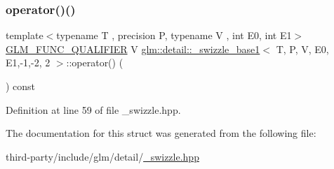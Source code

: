 \subsubsection{\texorpdfstring{operator()()}{operator()()}}
{\footnotesize\ttfamily template$<$typename T , precision P, typename V , int E0, int E1$>$ \\
\hyperlink{setup_8hpp_a33fdea6f91c5f834105f7415e2a64407}{G\+L\+M\+\_\+\+F\+U\+N\+C\+\_\+\+Q\+U\+A\+L\+I\+F\+I\+ER} V \hyperlink{structglm_1_1detail_1_1__swizzle__base1}{glm\+::detail\+::\+\_\+swizzle\+\_\+base1}$<$ T, P, V, E0, E1,-\/1,-\/2, 2 $>$\+::operator() (\begin{DoxyParamCaption}{ }\end{DoxyParamCaption}) const\hspace{0.3cm}{\ttfamily [inline]}}



Definition at line 59 of file \+\_\+swizzle.\+hpp.



The documentation for this struct was generated from the following file\+:\begin{DoxyCompactItemize}
\item 
third-\/party/include/glm/detail/\hyperlink{__swizzle_8hpp}{\+\_\+swizzle.\+hpp}\end{DoxyCompactItemize}
